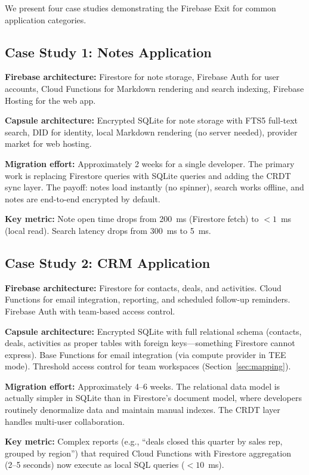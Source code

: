 \documentclass[11pt,a4paper]{article}
\begin{document}
We present four case studies demonstrating the Firebase Exit for common
application categories.

\subsection{Case Study 1: Notes Application}

\textbf{Firebase architecture:} Firestore for note storage, Firebase Auth
for user accounts, Cloud Functions for Markdown rendering and search
indexing, Firebase Hosting for the web app.

\textbf{Capsule architecture:} Encrypted SQLite for note storage with
FTS5 full-text search, DID for identity, local Markdown rendering (no
server needed), provider market for web hosting.

\textbf{Migration effort:} Approximately 2 weeks for a single developer.
The primary work is replacing Firestore queries with SQLite queries and
adding the CRDT sync layer. The payoff: notes load instantly (no spinner),
search works offline, and notes are end-to-end encrypted by default.

\textbf{Key metric:} Note open time drops from 200~ms (Firestore fetch)
to $<1$~ms (local read). Search latency drops from 300~ms to 5~ms.

\subsection{Case Study 2: CRM Application}

\textbf{Firebase architecture:} Firestore for contacts, deals, and
activities. Cloud Functions for email integration, reporting, and
scheduled follow-up reminders. Firebase Auth with team-based access control.

\textbf{Capsule architecture:} Encrypted SQLite with full relational
schema (contacts, deals, activities as proper tables with foreign keys---something
Firestore cannot express). Base Functions for email integration (via
compute provider in TEE mode). Threshold access control for team
workspaces (Section~\ref{sec:mapping}).

\textbf{Migration effort:} Approximately 4--6 weeks. The relational
data model is actually simpler in SQLite than in Firestore's document
model, where developers routinely denormalize data and maintain manual
indexes. The CRDT layer handles multi-user collaboration.

\textbf{Key metric:} Complex reports (e.g., ``deals closed this quarter
by sales rep, grouped by region'') that required Cloud Functions with
Firestore aggregation (2--5 seconds) now execute as local SQL queries
($<10$~ms).
\end{document}
